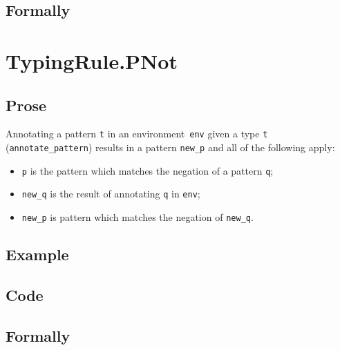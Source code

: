 \documentclass{book}
\begin{document}
\begin{emptyformal}
    \subsection{Formally}
\end{emptyformal}

 
\section{TypingRule.PNot \label{sec:TypingRule.PNot}}

  \subsection{Prose}
   Annotating a pattern \texttt{t} in an environment~\texttt{env} given a type \texttt{t} (\texttt{annotate\_pattern}) results in a pattern \texttt{new\_p} and all of the following apply:
   \begin{itemize}
   \item \texttt{p} is the pattern which matches the negation of a pattern \texttt{q};
   \item \texttt{new\_q} is the result of annotating \texttt{q} in \texttt{env}; 
   \item \texttt{new\_p} is pattern which matches the negation of \texttt{new\_q}.
   \end{itemize}

  \subsection{Example}

  \subsection{Code}

\begin{emptyformal}
    \subsection{Formally}
\end{emptyformal}

 
\end{document}
